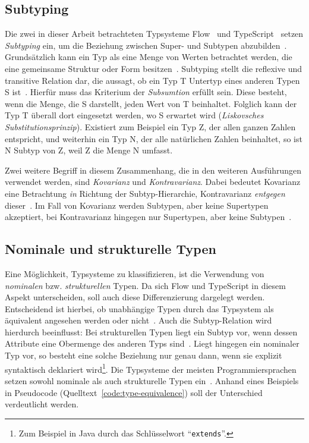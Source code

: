 \subsection{Subtyping}

Die zwei in dieser Arbeit betrachteten Typsysteme Flow~\autocite{FLOW:PAPER} und TypeScript~\autocite{TYPESCRIPT:SPEC} setzen \textit{Subtyping} ein, um die Beziehung zwischen Super- und Subtypen abzubilden~\autocites{FLOW:PAPER,BIERMAN:2014}. Grundsätzlich kann ein Typ als eine Menge von Werten betrachtet werden, die eine gemeinsame Struktur oder Form besitzen~\autocite[3]{AMADIO:1993}. Subtyping stellt die reflexive und transitive Relation dar, die aussagt, ob ein Typ T Untertyp eines anderen Typen S ist~\autocite[27\psq]{CARDELLI:TYPE_SYSTEMS}. Hierfür muss das Kriterium der \emph{Subsumtion} erfüllt sein. Diese besteht, wenn die Menge, die S darstellt, jeden Wert von T beinhaltet. Folglich kann der Typ T überall dort eingesetzt werden, wo S erwartet wird (\textit{Liskovsches Substitutionsprinzip}). Existiert zum Beispiel ein Typ Z, der allen ganzen Zahlen entspricht, und weiterhin ein Typ N, der alle natürlichen Zahlen beinhaltet, so ist N Subtyp von Z, weil Z die Menge N umfasst.

Zwei weitere Begriff in diesem Zusammenhang, die in den weiteren Ausführungen verwendet werden, sind \emph{Kovarianz} und \emph{Kontravarianz}. Dabei bedeutet Kovarianz eine Betrachtung \emph{in} Richtung der Subtyp-Hierarchie, Kontravarianz \emph{entgegen} dieser~\autocite{VARIANCE}. Im Fall von Kovarianz werden Subtypen, aber keine Supertypen akzeptiert, bei Kontravarianz hingegen nur Supertypen, aber keine Subtypen~\autocite{FLOW:VARIANCE}.

\subsection{Nominale und strukturelle Typen}
Eine Möglichkeit, Typsysteme zu klassifizieren, ist die Verwendung von \textit{nominalen} bzw. \textit{strukturellen} Typen. Da sich Flow und TypeScript in diesem Aspekt unterscheiden, soll auch diese Differenzierung dargelegt werden. Entscheidend ist hierbei, ob unabhängige Typen durch das Typsystem als äquivalent angesehen werden oder nicht~\autocite[9]{CARDELLI:TYPE_SYSTEMS}. Auch die Subtyp-Relation wird hierdurch beeinflusst: Bei strukturellen Typen liegt ein Subtyp vor, wenn dessen Attribute eine Obermenge des anderen Typs sind~\autocite{MALAYERI:2008}. Liegt hingegen ein nominaler Typ vor, so besteht eine solche Beziehung nur genau dann, wenn sie explizit syntaktisch deklariert wird\footnote{Zum Beispiel in Java durch das Schlüsselwort \enquote{\texttt{extends}}.}. Die Typsysteme der meisten Programmiersprachen setzen sowohl nominale als auch strukturelle Typen ein~\autocite[9]{CARDELLI:TYPE_SYSTEMS}. Anhand eines Beispiels in Pseudocode (Quelltext~\ref{code:type-equivalence}) soll der Unterschied verdeutlicht werden.


